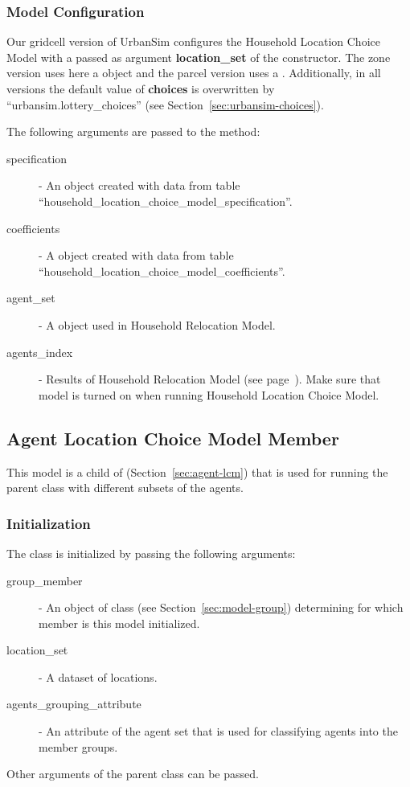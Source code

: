 \subsubsection{Model Configuration}
%
Our gridcell version of UrbanSim configures the Household Location Choice Model with a 
 passed as
argument {\bf location_set} of the constructor. The zone version uses here a  object
and the parcel version uses a .
Additionally, in all versions the default
value of {\bf choices} is overwritten by ``urbansim.lottery_choices'' (see
Section~\ref{sec:urbansim-choices}).

The following arguments are passed to
  the  method:
\begin{description}
\item[specification] - An  object created with
  data from table ``household_location_choice_model_specification''. 
\item[coefficients] - A  object created with data from
  table ``household_location_choice_model_coefficients''.
\item[agent_set] - A  object used in Household Relocation
  Model.
\item[agents_index] - Results of Household Relocation Model (see page~\pageref{page:HRM}). 
Make sure that model is turned on 
when running Household Location Choice Model.
\end{description}


\subsection{Agent Location Choice Model Member}
%
\label{sec:agent-lcm-member}
%
This model is a child of  
(Section~\ref{sec:agent-lcm}) that is used 
for running the parent class with different subsets of the agents.

\subsubsection{Initialization}
%
The class is initialized by passing the following arguments:
\begin{description}
\item[group_member] - An object of class  (see Section~\ref{sec:model-group}) 
  determining for which member is this model initialized.
\item[location_set] - A dataset of locations.
\item[agents_grouping_attribute] - An attribute of the agent set that is used for classifying agents into the member groups. 
\end{description}
Other arguments of the parent class can be passed. 

